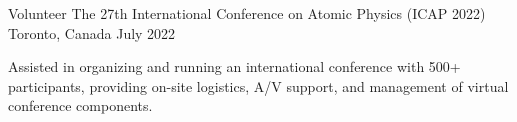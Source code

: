 \begin{cventries}
    \cventry
      {Volunteer} %
      {The 27th International Conference on Atomic Physics (ICAP 2022)} %
      {Toronto, Canada} %
      {July 2022} %
      {
        \begin{cvitems}
        \item {Assisted in organizing and running an international conference with 500+ participants, providing on-site logistics, A/V support, and management of virtual conference components.}
        \end{cvitems}
      }



\end{cventries}
